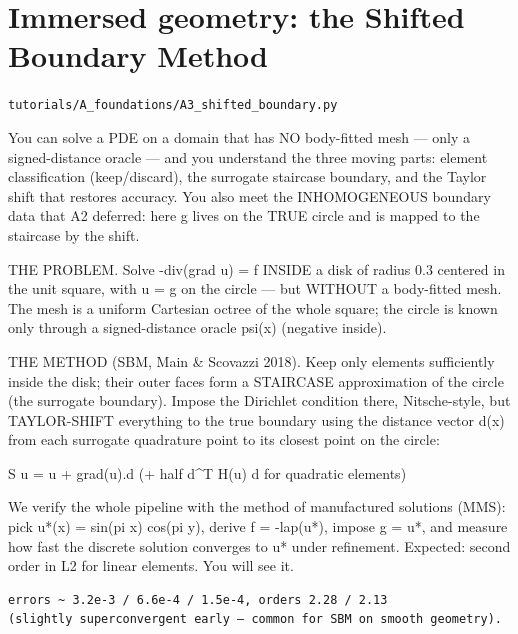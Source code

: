 \chapter{Immersed geometry: the Shifted Boundary Method}
\label{ch:A3_shifted_boundary}
\noindent\texttt{tutorials/A\_foundations/A3\_shifted\_boundary.py}\\[0.75em]
\begin{outcome}
You can solve a PDE on a domain that has NO body-fitted
mesh — only a signed-distance oracle — and you understand the three moving
parts: element classification (keep/discard), the surrogate staircase
boundary, and the Taylor shift that restores accuracy. You also meet the
INHOMOGENEOUS boundary data that A2 deferred: here g lives on the TRUE
circle and is mapped to the staircase by the shift.
\end{outcome}

THE PROBLEM. Solve  -div(grad u) = f  INSIDE a disk of radius 0.3 centered in
the unit square, with u = g on the circle — but WITHOUT a body-fitted mesh.
The mesh is a uniform Cartesian octree of the whole square; the circle is
known only through a signed-distance oracle psi(x) (negative inside).

THE METHOD (SBM, Main \& Scovazzi 2018). Keep only elements sufficiently
inside the disk; their outer faces form a STAIRCASE approximation of the
circle (the surrogate boundary). Impose the Dirichlet condition there,
Nitsche-style, but TAYLOR-SHIFT everything to the true boundary using the
distance vector d(x) from each surrogate quadrature point to its closest
point on the circle:

    S u = u + grad(u).d          (+ half d\textasciicircum{}T H(u) d for quadratic elements)

We verify the whole pipeline with the method of manufactured solutions (MMS):
pick u*(x) = sin(pi x) cos(pi y), derive f = -lap(u*), impose g = u*, and
measure how fast the discrete solution converges to u* under refinement.
Expected: second order in L2 for linear elements. You will see it.

\begin{expected}
\begin{verbatim}
errors ~ 3.2e-3 / 6.6e-4 / 1.5e-4, orders 2.28 / 2.13
(slightly superconvergent early — common for SBM on smooth geometry).
\end{verbatim}
\end{expected}


